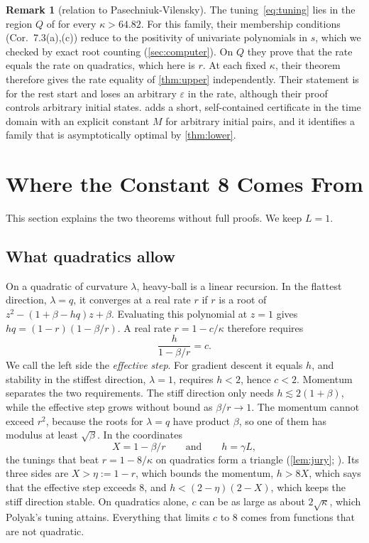 \documentclass[11pt, a4paper]{article}
\theoremstyle{definition}
\newtheorem{remark}{Remark}
\newcommand{\eps}{\varepsilon}
\begin{document}
\begin{remark}[relation to Pasechniuk-Vilensky]
  \label{rem:pv}
  The tuning~\eqref{eq:tuning} lies in the region $Q$ of \citet[Thm.~7.2(b)]{pasechniuk2026two} for every
  $\kappa>64.82$. For this family, their membership conditions (Cor.~7.3(a),(c)) reduce to the positivity of univariate
  polynomials in $s$, which we checked by exact root counting (\cref{sec:computer}). On $Q$ they prove that the rate
  equals the rate on quadratics, which here is $r$. At each fixed $\kappa$, their theorem therefore gives the rate equality of
  \cref{thm:upper} independently. Their statement is for the rest start and loses an arbitrary $\eps$ in the
  rate, although their proof controls arbitrary initial states.  adds a short, self-contained
  certificate in the time domain with an explicit constant $M$ for arbitrary initial pairs, and it identifies a family
  that is asymptotically optimal by \cref{thm:lower}.
\end{remark}

\section{Where the Constant 8 Comes From}
\label{sec:intuition}

This section explains the two theorems without full proofs. We keep $L=1$.

\subsection{What quadratics allow}
\label{sec:quadratics}

On a quadratic of curvature $\lambda$, heavy-ball is a linear recursion. In the flattest direction, $\lambda=q$, it
converges at a real rate $r$ if $r$ is a root of $z^2-(1+\beta-hq)z+\beta$. Evaluating this polynomial at $z=1$ gives
$hq=(1-r)(1-\beta/r)$. A real rate $r=1-c/\kappa$ therefore requires
\[
  \frac{h}{1-\beta/r}=c.
\]
We call the left side the \emph{effective step}. For gradient descent it equals $h$, and stability in the stiffest
direction, $\lambda=1$, requires $h<2$, hence $c<2$. Momentum separates the two requirements. The stiff direction only
needs $h\lesssim2(1+\beta)$, while the effective step grows without bound as $\beta/r\to1$. The momentum cannot exceed
$r^2$, because the roots for $\lambda=q$ have product $\beta$, so one of them has modulus at least $\sqrt\beta$. In the
coordinates
\[
  X=1-\beta/r\qquad\text{and}\qquad h=\gamma L,
\]
the tunings that beat $r=1-8/\kappa$ on quadratics form a triangle (\cref{lem:jury};
\citealp[Lemma~2.4]{goujaud2025provable}). Its three sides are $X>\eta:=1-r$, which bounds the momentum, $h>8X$, which
says that the effective step exceeds $8$, and $h<(2-\eta)(2-X)$, which keeps the stiff direction stable. On quadratics
alone, $c$ can be as large as about $2\sqrt\kappa$, which Polyak's tuning attains. Everything that limits $c$ to $8$
comes from functions that are not quadratic.
\end{document}
